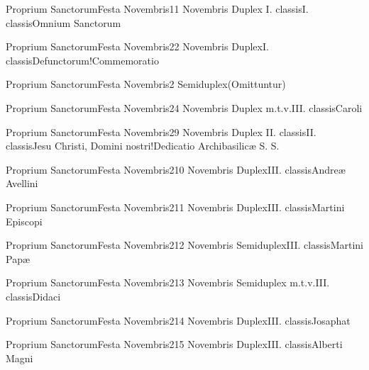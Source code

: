 \documentclass[nocturnale-romanum.tex]{subfiles}
\begin{document}

	{Proprium Sanctorum}{Festa Novembris}{1}{1 Novembris}
	{Duplex I. classis}{I. classis}{Omnium Sanctorum}
	{}
	{}

	{Proprium Sanctorum}{Festa Novembris}{2}{2 Novembris}
	{Duplex}{I. classis}{Defunctorum!Commemoratio}
	{}
	{}

	{Proprium Sanctorum}{Festa Novembris}{2}{}
	{Semiduplex}{(Omittuntur)}{}
	{}
	{}

	{Proprium Sanctorum}{Festa Novembris}{2}{4 Novembris}
	{Duplex m.t.v.}{III. classis}{Caroli}
	{}
	{}

	{Proprium Sanctorum}{Festa Novembris}{2}{9 Novembris}
	{Duplex II. classis}{II. classis}{Jesu Christi, Domini nostri!Dedicatio Archibasilicæ S. S.}
	{}
	{}

	{Proprium Sanctorum}{Festa Novembris}{2}{10 Novembris}
	{Duplex}{III. classis}{Andreæ Avellini}
	{}
	{}

	{Proprium Sanctorum}{Festa Novembris}{2}{11 Novembris}
	{Duplex}{III. classis}{Martini Episcopi}
	{}
	{}

	{Proprium Sanctorum}{Festa Novembris}{2}{12 Novembris}
	{Semiduplex}{III. classis}{Martini Papæ}
	{}
	{}

	{Proprium Sanctorum}{Festa Novembris}{2}{13 Novembris}
	{Semiduplex m.t.v.}{III. classis}{Didaci}
	{}
	{}

	{Proprium Sanctorum}{Festa Novembris}{2}{14 Novembris}
	{Duplex}{III. classis}{Josaphat}
	{}
	{}

	{Proprium Sanctorum}{Festa Novembris}{2}{15 Novembris}
	{Duplex}{III. classis}{Alberti Magni}
	{}
	{}
\end{document}
